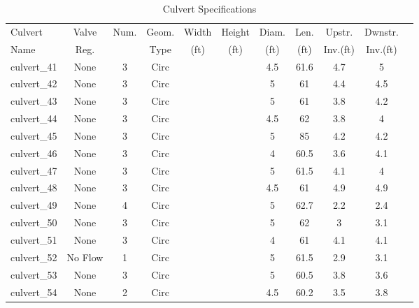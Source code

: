 \begin{table}[]
\caption{Culvert Specifications}
\label{tab:culv-specs1}
\begin{tabular}{@{}lcccccccccc@{}}
\toprule
Culvert       & Valve      & Num.     & Geom.& Width  & Height & Diam.    & Len.   & Upstr.    & Dwnstr.    \\
Name          & Reg.       &          & Type & (ft)   & (ft)   & (ft)     & (ft)   & Inv.(ft)  & Inv.(ft)   \\
\midrule
culvert\_41   & None       & 3        & Circ &        &       & 4.5      & 61.6   & 4.7       & 5          \\
culvert\_42   & None       & 3        & Circ &        &       & 5        & 61     & 4.4       & 4.5        \\
culvert\_43   & None       & 3        & Circ &        &       & 5        & 61     & 3.8       & 4.2        \\
culvert\_44   & None       & 3        & Circ &        &       & 4.5      & 62     & 3.8       & 4          \\
culvert\_45   & None       & 3        & Circ &        &       & 5        & 85     & 4.2       & 4.2        \\
culvert\_46   & None       & 3        & Circ &        &       & 4        & 60.5   & 3.6       & 4.1        \\
culvert\_47   & None       & 3        & Circ &        &       & 5        & 61.5   & 4.1       & 4          \\
culvert\_48   & None       & 3        & Circ &        &       & 4.5      & 61     & 4.9       & 4.9        \\
culvert\_49   & None       & 4        & Circ &        &       & 5        & 62.7   & 2.2       & 2.4        \\
culvert\_50   & None       & 3        & Circ &        &       & 5        & 62     & 3         & 3.1        \\
culvert\_51   & None       & 3        & Circ &        &       & 4        & 61     & 4.1       & 4.1        \\
culvert\_52   & No Flow    & 1        & Circ &        &       & 5        & 61.5   & 2.9       & 3.1        \\
culvert\_53   & None       & 3        & Circ &        &       & 5        & 60.5   & 3.8       & 3.6        \\
culvert\_54   & None       & 2        & Circ &        &       & 4.5      & 60.2   & 3.5       & 3.8        \\

\end{tabular}
\end{table}
